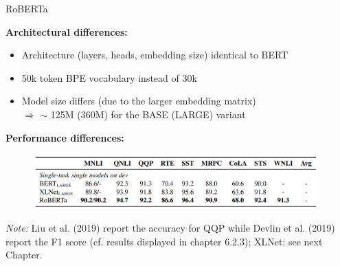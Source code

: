 \begin{frame}{RoBERTa \href{https://arxiv.org/pdf/1907.11692.pdf}{}}

\textbf{Architectural differences:}

\begin{itemize}
\item Architecture (layers, heads, embedding size) identical to BERT
\item 50k token BPE vocabulary instead of 30k
\item Model size differs (due to the larger embedding matrix)\\
			$\Rightarrow$ $\sim$ 125M (360M) for the BASE (LARGE) variant 
\end{itemize}

\textbf{Performance differences:}

\begin{figure}
\centering
\includegraphics[width = 11cm]{figure/roberta-sota.png}\\ 
\end{figure}

\vfill

\scriptsize
\textit{Note:} Liu et al. (2019) report the accuracy for QQP while Devlin et al. (2019) report the F1 score (cf. results displayed in chapter 6.2.3); XLNet: see next Chapter.

\end{frame}


